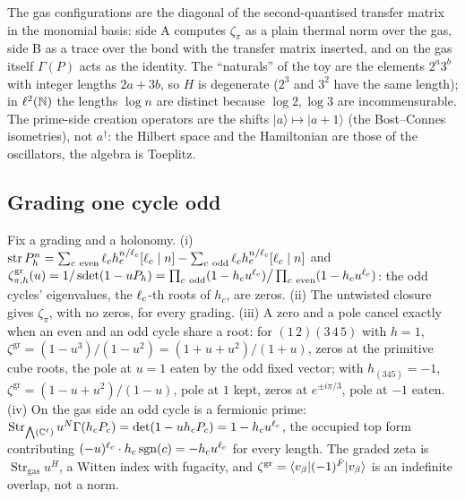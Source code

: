 The gas configurations are the diagonal of the second-quantised transfer matrix in the monomial
basis: side A computes $\zeta_\pi$ as a plain thermal norm over the gas, side B as a trace over
the bond with the transfer matrix inserted, and on the gas itself $\Gamma(P)$ acts as the identity.
The ``naturals'' of the toy are the elements $2^a3^b$ with integer lengths $2a+3b$, so $H$ is
degenerate ($2^3$ and $3^2$ have the same length); in $\ell^2(\mathbb N)$ the lengths $\log n$ are
distinct because $\log2,\log3$ are incommensurable. The prime-side creation operators are the
shifts $|a\rangle\mapsto|a+1\rangle$ (the Bost--Connes isometries), not $a^\dagger$: the Hilbert
space and the Hamiltonian are those of the oscillators, the algebra is Toeplitz.

\subsection{Grading one cycle odd}

\begin{theorem}
\label{thm:permutation-induced-zeros}
Fix a grading and a holonomy. (i) $\str P_h^n = \sum_{c\ \mathrm{even}}\wl_ch_c^{n/\wl_c}[\wl_c\mid n]
- \sum_{c\ \mathrm{odd}}\wl_ch_c^{n/\wl_c}[\wl_c\mid n]$ and
$\zeta^{\mathrm{gr}}_{\pi,h}(u) = 1/\operatorname{sdet}(1-uP_h) = \prod_{c\ \mathrm{odd}}(1-h_cu^{\ell_c})\big/
\prod_{c\ \mathrm{even}}(1-h_cu^{\ell_c})$: the odd cycles' eigenvalues, the $\ell_c$-th roots of
$h_c$, are zeros. (ii) The untwisted closure gives $\zeta_\pi$, with no zeros, for every grading.
(iii) A zero and a pole cancel exactly when an even and an odd cycle share a root: for
$(1\,2)(3\,4\,5)$ with $h = 1$, $\zeta^{\mathrm{gr}} = (1-u^3)/(1-u^2) = (1+u+u^2)/(1+u)$, zeros at
the primitive cube roots, the pole at $u = 1$ eaten by the odd fixed vector; with $h_{(345)} = -1$,
$\zeta^{\mathrm{gr}} = (1-u+u^2)/(1-u)$, pole at $1$ kept, zeros at $e^{\pm i\pi/3}$, pole at $-1$
eaten. (iv) On the gas side an odd cycle is a fermionic prime:
$\operatorname{Str}_{\bigwedge(\mathbb C^{\ell})}u^N\Gamma(h_cP_c) = \det(1-uh_cP_c) = 1-h_cu^{\ell_c}$,
the occupied top form contributing $(-u)^{\ell_c}\cdot h_c\operatorname{sgn}(c) = -h_cu^{\ell_c}$ for
every length. The graded zeta is $\operatorname{Str}_{\mathrm{gas}}u^H$, a Witten index with fugacity, and
$\zeta^{\mathrm{gr}} = \langle v_\beta|(-1)^{\hat F}|v_\beta\rangle$ is an indefinite overlap, not a norm.
\end{theorem}

